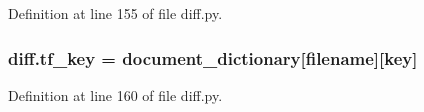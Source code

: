 Definition at line 155 of file diff.\+py.

\subsubsection[{\texorpdfstring{tf\+\_\+key}{tf_key}}]{\setlength{\rightskip}{0pt plus 5cm}diff.\+tf\+\_\+key = {\bf document\+\_\+dictionary}\mbox{[}filename\mbox{]}\mbox{[}key\mbox{]}}\hypertarget{namespacediff_ab860e167471d632882c770f12e87927e}{}\label{namespacediff_ab860e167471d632882c770f12e87927e}


Definition at line 160 of file diff.\+py.

